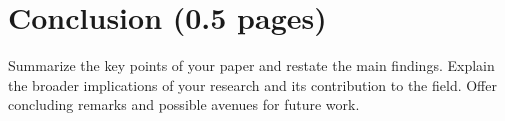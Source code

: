 \chapter{Conclusion (0.5 pages)}
\label{ch:conclusion}
Summarize the key points of your paper and restate the main findings. Explain the broader implications of your research and its contribution to the field. Offer concluding remarks and possible avenues for future work.